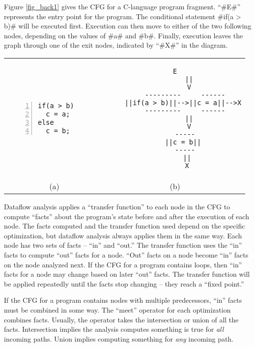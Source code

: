\documentclass[12pt]{report}
\begin{document}
Figure \ref{fig_back1} gives the CFG for a C-language program
fragment.  ``#E#'' represents the entry point for the program. The
conditional statement #if(a > b)# will be executed first. Execution
can then move to either of the two following nodes, depending on the
values of #a# and #b#. Finally, execution leaves the graph through one of
the exit nodes, indicated by ``#X#'' in the diagram.

\begin{myfig}[th]
\begin{tabular}{cc}
\begin{minipage}[t]{1in}
\begin{Verbatim}[numbers=left]
if(a > b)
  c = a; 
else     
  c = b; 
\end{Verbatim}
\end{minipage} \vline & 
\begin{minipage}[t]{1in}
  \begin{Verbatim}[gobble=2]
       E
       ||
       V
     ---------     ------
    ||if(a > b)||-->||c = a||-->X
     ---------     ------
       ||
       V
     -----
    ||c = b||
     -----
      ||
      X
  \end{Verbatim}
\end{minipage} \\
 (a) & (b) \rule{0pt}{24pt}
\end{tabular}
\caption{A C-language program fragment (\emph{a}) and its associated
  control-flow graph (\emph{b}). Notice that all possible paths are
  shown in the CFG. Each specific execution of the program will
  depend on the values of \verb=a= and \verb=b=.}
\label{fig_back1}
\end{myfig}

Dataflow analysis applies a ``transfer function'' to each node in the
CFG to compute ``facts'' about the program's state before and after
the execution of each node. The facts computed and the transfer
function used depend on the specific optimization, but dataflow
analysis always applies them in the same way. Each node has two sets
of facts -- ``in'' and ``out.'' The transfer function uses the ``in''
facts to compute ``out'' facts for a node. ``Out'' facts on a node
become ``in'' facts on the node analyzed next.  If the CFG for a
program contains loops, then ``in'' facts for a node may change based
on later ``out'' facts. The transfer function will be applied
repeatedly until the facts stop changing -- they reach a ``fixed
point.''

If the CFG for a program contains nodes with multiple predecessors,
``in'' facts must be combined in some way. The ``meet'' operator for
each optimization combines facts. Usually, the operator takes the
intersection or union of all the facts. Intersection implies the
analysis computes something is true for \emph{all} incoming paths. Union
implies computing something for \emph{any} incoming path.
\end{document}
